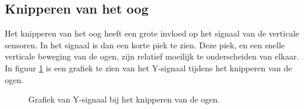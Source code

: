 \documentclass{article}
\newcommand{\figwidth}{0.82\linewidth}
\begin{document}
\subsection{Knipperen van het oog}
Het knipperen van het oog heeft een grote invloed op het signaal van de verticale sensoren. In het signaal is dan een korte piek te zien. Deze piek, en een snelle verticale beweging van de ogen, zijn relatief moeilijk te onderscheiden van elkaar. In figuur \ref{fig:blinksnotfiltered} is een grafiek te zien van het Y-signaal tijdens het knipperen van de ogen.

\begin{figure}[H]
	\centering
	\caption{Grafiek van Y-signaal bij het knipperen van de ogen.}
	\label{fig:blinksnotfiltered}
\end{figure}
\end{document}

